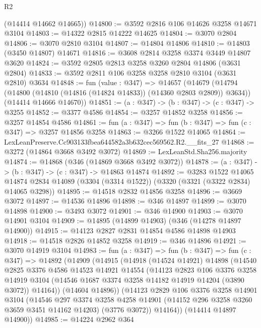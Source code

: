 \begin{lexlean}{R2}
\begin{coremodule}
      (@14414 @14662 @14665))
@14800 := @3592 @2816 @106 @14626 @3258 @14671 @3104
@14803 := @14322 @2815 @14222 @14625
@14804 := @3070 @2804
@14806 := @3070 @2810 @3104
@14807 := @14804 @14806
@14810 := @14803 (@3450 @14807) @14671
@14816 := @3608 @2814 @3258 @3374 @3449 @14807 @3620
@14824 := @3592 @2805 @2813 @3258 @3260 @2804 @14806 (@3631 @2804)
@14833 := @3592 @2811 @106 @3258 @3258 @2810 @3104 (@3631 @2810) @3634
@14848 := fun (value : @347) =>
  @14657
    (@14679
      (@14794 (@14800 (@14810 (@14816 (@14824 @14833)) (@14360 @2803 @2809)) @3634))
      (@14414 @14666 @14670))
@14851 := (a : @347) -> (b : @347) -> (c : @347) -> @3255
@14852 := @3377 @4586
@14854 := @3257 @14852 @3258
@14856 := @3257 @14854 @4586
@14861 := fun (a : @347) => fun (b : @347) => fun (c : @347) => @3257 @14856 @3258
@14863 := @3266 @1522 @14065
@14864 := LexLeanPreserve.Cc903133fbea644582a3b632cec569562.R2.__fits_27
@14868 := @3272 (@14864 @3668 @3492 @3072)
@14869 := LexLeanStd.Sha256.majority
@14874 := @14868 (@346 (@14869 @3668 @3492 @3072))
@14878 := (a : @347) -> (b : @347) -> (c : @347) -> @14863 @14874
@14892 := @3283
    @1522
    @14065
    @14874
    @2834
    @14089
    (@3304 (@3314 @1522))
    (@3320 (@3321 (@3322 @2834) @14065 @3298))
@14895 := @14518 @2832 @14856 @3258
@14896 := @3669 @3072
@14897 := @14536 @14896
@14898 := @346 @14897
@14899 := @3070 @14898
@14900 := @3493 @3072
@14901 := @346 @14900
@14903 := @3070 @14901 @3104
@14909 := @14895 (@14899 @14903) (@346 (@14278 @14897 @14900))
@14915 := @14123 @2827 @2831 @14854 @4586 @14898 @14903
@14918 := @14518 @2826 @14852 @3258
@14919 := @346 @14896
@14921 := @3070 @14919 @3104
@14983 := fun (a : @347) =>
  fun (b : @347) =>
  fun (c : @347) =>
  @14892
    (@14909
      (@14915
        (@14918
          (@14524 @14921)
          @14898
          (@14540
            @2825
            @3376
            @4586
            @14523
            @14921
            @14554
            (@14123
              @2823
              @106
              @3376
              @3258
              @14919
              @3104
              (@14546 @1687 @3374 @3258 @14182 @14919 @14204 (@3890 @3072))
              @14164))
          (@14604 @14896))
        (@14123
          @2829
          @106
          @3376
          @3258
          @14901
          @3104
          (@14546
            @297
            @3374
            @3258
            @4258
            @14901
            (@14152 @296 @3258 @3260 @3659 @3451 @14162 @14203)
            (@3776 @3072))
          @14164))
      (@14414 @14897 @14900))
@14985 := @14224 @2962 @364

\end{coremodule}
\end{lexlean}
